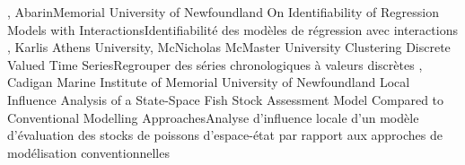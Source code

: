 {
,  {Abarin}{Memorial University of Newfoundland}
}
{On Identifiability of Regression Models with Interactions}{Identifiabilité des modèles de régression avec interactions}
{\bubbleE \enspace \screenE}
{
,  {Karlis}
{Athens University},  {McNicholas}
{McMaster University}
}
{Clustering Discrete Valued Time Series}{Regrouper des séries chronologiques à valeurs discrètes}
{\bubbleE \enspace \screenE}
{
,  {Cadigan}
{Marine Institute of Memorial University of Newfoundland}
}
{Local Influence Analysis of a State-Space Fish Stock Assessment Model Compared to Conventional Modelling Approaches}{Analyse d’influence locale d’un modèle d’évaluation des stocks de poissons d’espace-état par rapport aux approches de modélisation conventionnelles}
{\bubbleE \enspace \screenE}

